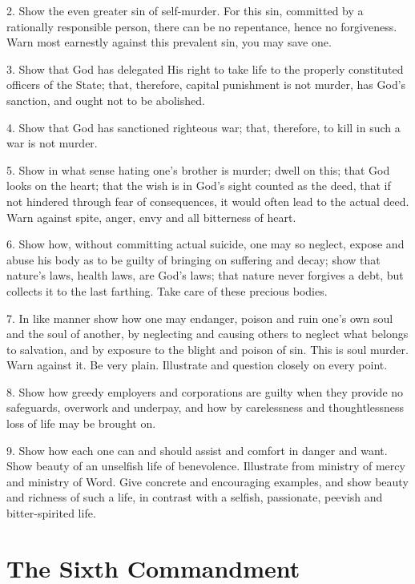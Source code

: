 2. Show the even greater sin of self-murder. For this sin, committed by a rationally responsible person, there can be no repentance, hence no forgiveness. Warn most earnestly against this prevalent sin, you may save one.

 3. Show that God has delegated His right to take life to the properly constituted officers of the State; that, therefore, capital punishment is not murder, has God’s sanction, and ought not to be abolished.

4. Show that God has sanctioned righteous war; that, therefore, to kill in such a war is not murder.

 5. Show in what sense hating one’s brother is murder; dwell on this; that God looks on the heart; that the wish is in God’s sight counted as the deed, that if not hindered through fear of consequences, it would often lead to the actual deed. Warn against spite, anger, envy and all bitterness of heart.

 6. Show how, without committing actual suicide, one may so neglect, expose and abuse his body as to be guilty of bringing on suffering and decay; show that nature’s laws, health laws, are God’s laws; that nature never forgives a debt, but collects it to the last farthing. Take care of these precious bodies.

 7. In like manner show how one may endanger, poison and ruin one’s own soul and the soul of another, by neglecting and causing others to neglect what belongs to salvation, and by exposure to the blight and poison of sin. This is soul murder. Warn against it. Be very plain. Illustrate and question closely on every point.

8. Show how greedy employers and corporations are guilty when they provide no safeguards, overwork and underpay, and how by carelessness and thoughtlessness loss of life may be brought on.

9. Show how each one can and should assist and comfort in danger and want. Show beauty of an
 unselfish life of benevolence. Illustrate from ministry of mercy and ministry of Word. Give concrete and encouraging examples, and show beauty and richness of such a life, in contrast with a selfish, passionate, peevish and bitter-spirited life.

\section{The Sixth Commandment}


